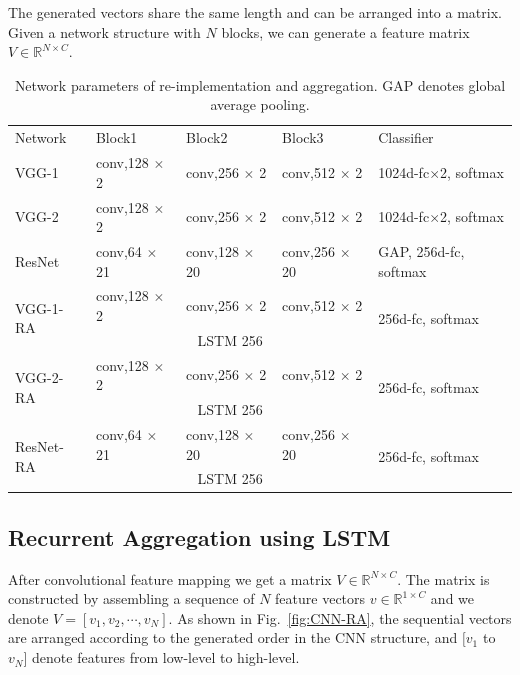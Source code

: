 \documentclass[conference]{IEEEtran}
\begin{document}
The generated vectors share the same length and can be arranged into a matrix. Given a network structure with $N$ blocks, we can generate a feature matrix $V\in \mathbb{R}^{N\times C}$.
\setlength{\tabcolsep}{4pt}
\linespread{1.4}
\begin{table}
\begin{center}
\caption{
Network parameters of re-implementation and aggregation. GAP denotes global average pooling.
}
\label{table:struc}
\begin{tabular}{l|l|l|l|l}
\hline\noalign{\smallskip}
Network& Block1 & Block2 & Block3 & Classifier\\
\noalign{\smallskip}
\hline
\noalign{\smallskip}
VGG-1 & conv,128 $\times$ 2 & conv,256 $\times$ 2 & conv,512 $\times$ 2 & 1024d-fc$\times$2, softmax \\
\hline
VGG-2 & conv,128 $\times$ 2 & conv,256 $\times$ 2 & conv,512 $\times$ 2 & 1024d-fc$\times$2, softmax \\
\hline
ResNet & conv,64 $\times$ 21 & conv,128 $\times$ 20 & conv,256 $\times$ 20 & GAP, 256d-fc, softmax \\
\hline
\multirow{2}{*}{VGG-1-RA} & conv,128 $\times$ 2 & conv,256 $\times$ 2 & conv,512 $\times$ 2 & \multirow{2}{3cm}{256d-fc, softmax} \\
\cline{2-4}
						& \multicolumn{3}{c|}{LSTM 256} \\
\hline
\multirow{2}{*}{VGG-2-RA} & conv,128 $\times$ 2 & conv,256 $\times$ 2 & conv,512 $\times$ 2 & \multirow{2}{3cm}{256d-fc, softmax} \\
\cline{2-4}
						& \multicolumn{3}{c|}{LSTM 256} \\
\hline
\multirow{2}{*}{ResNet-RA} & conv,64 $\times$ 21 & conv,128 $\times$ 20 & conv,256 $\times$ 20 &\multirow{2}{3cm}{256d-fc, softmax} \\
\cline{2-4}
					& \multicolumn{3}{c|}{LSTM 256}\\
\hline
\end{tabular}
\end{center}
\end{table}
\setlength{\tabcolsep}{1.4pt}


\subsection{Recurrent Aggregation using LSTM}
After convolutional feature mapping we get a matrix $V\in \mathbb{R}^{N\times C}$. The matrix is constructed by assembling a sequence of $N$ feature vectors $v \in \mathbb{R}^{1\times C}$ and we denote $V=[v_1, v_2, \cdots, v_N]$. As shown in Fig.~\ref{fig:CNN-RA}, the sequential vectors are arranged according to the generated order in the CNN structure, and $[v_1$ to $v_N]$ denote features from low-level  to high-level. 
\end{document}

